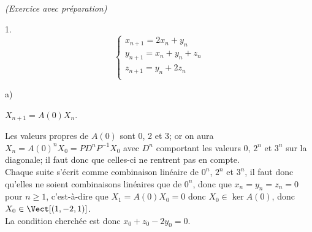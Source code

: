 \documentclass[11pt]{article}%
\begin{document}
\begin{exercice}{\it (Exercice avec préparation)}
\begin{noliste}{1.}
\[
 \left\{ 
\begin{array}{l}
 x_{n + 1} = 2 x_{n} + y_{n} \\
y_{n + 1} = x_{n} + y_{n} + z_{n} \\
z_{n + 1} = y_{n} + 2 z_{n} \\
\end{array}
\right. 
 
\]
 \begin{noliste}{a)}
 \setlength{\itemsep}{2mm}
 \item $X_{n + 1} = A(0) X_{n}$. \\
 \item Les valeurs propres de $A(0)$ sont 0, 2 et 3; or on aura $X_{n}
= A(0)^{n} X_{0} = P D^{n} P^{-1} X_{0}$ avec $D^{n}$ comportant les
valeurs 0, $2^{n}$ et $3^{n}$ sur la diagonale; il faut donc que
celles-ci ne rentrent pas en compte. \\
 Chaque suite s'écrit comme combinaison linéaire de $0^{n}$, $2^{n}$ et
$3^{n}$, il faut donc qu'elles ne soient combinaisons linéaires que de
$0^{n}$, donc que $x_{n} = y_{n} = z_{n} = 0$ pour $n \geq 1$,
c'est-à-dire que $X_{1} = A (0) X_{0} = 0$ donc $X_{0} \in \ker A(0)$,
donc $X_{0} \in \Vect[ (1, -2, 1)]$. \\
 La condition cherchée est donc $x_{0} + z_{0} - 2 y_{0} = 0$. \\
 \end{noliste}
 \item
\end{noliste}
\end{exercice}
\end{document}
